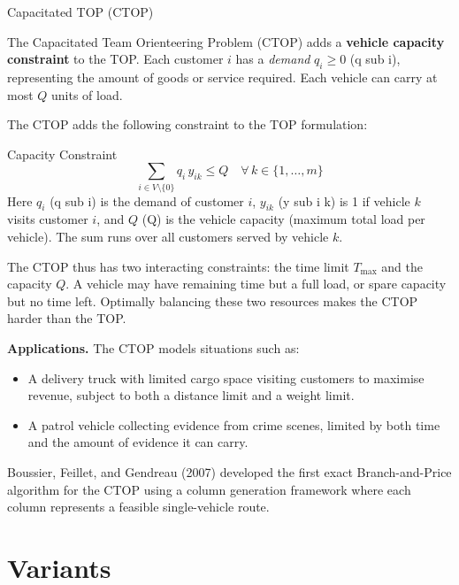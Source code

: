\documentclass[aspectratio=169,10pt]{beamer}
\begin{document}
\begin{frame}[allowframebreaks]{Capacitated TOP (CTOP)}

  The Capacitated Team Orienteering Problem (CTOP) adds a
  \textbf{vehicle capacity constraint} to the TOP.
  Each customer $i$ has a \emph{demand} $q_i \ge 0$ (q sub i), representing
  the amount of goods or service required.
  Each vehicle can carry at most $Q$ units of load.

  \medskip
  The CTOP adds the following constraint to the TOP formulation:
  \begin{block}{Capacity Constraint}
    \[
      \sum_{i \in V \setminus \{0\}} q_i \, y_{ik} \le Q
      \quad \forall\, k \in \{1, \ldots, m\}
      \tag{CTOP.cap}
    \]
    Here $q_i$ (q sub i) is the demand of customer $i$, $y_{ik}$
    (y sub i k) is 1 if vehicle $k$ visits customer $i$, and $Q$ (Q) is
    the vehicle capacity (maximum total load per vehicle).
    The sum runs over all customers served by vehicle $k$.
  \end{block}

  \medskip
  The CTOP thus has two interacting constraints: the time limit
  $T_{\max}$ and the capacity $Q$.
  A vehicle may have remaining time but a full load, or spare capacity
  but no time left.
  Optimally balancing these two resources makes the CTOP harder than the TOP.

  \medskip
  \textbf{Applications.}
  The CTOP models situations such as:
  \begin{itemize}
    \item A delivery truck with limited cargo space visiting customers
          to maximise revenue, subject to both a distance limit and a
          weight limit.
    \item A patrol vehicle collecting evidence from crime scenes, limited
          by both time and the amount of evidence it can carry.
  \end{itemize}

  \medskip
  Boussier, Feillet, and Gendreau (2007) developed the first exact
  Branch-and-Price algorithm for the CTOP using a column generation
  framework where each column represents a feasible single-vehicle route.

\end{frame}

\section{Variants}
\end{document}
